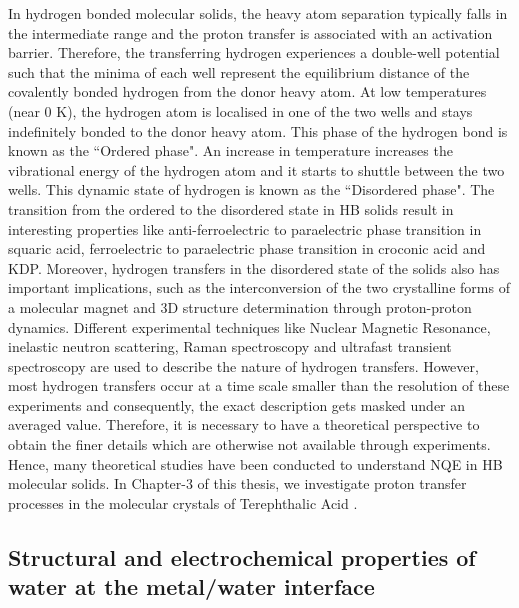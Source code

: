 \noindent In hydrogen bonded molecular solids, the heavy atom separation typically falls in the intermediate range\cite{gilli2000towards,steiner2002hydrogen} and the proton transfer is associated with an activation barrier. Therefore, the transferring hydrogen experiences a double-well potential such that the minima of each well represent the equilibrium distance of the covalently bonded hydrogen from the donor heavy atom. At low temperatures (near 0 K), the hydrogen atom is localised in one of the two wells and stays indefinitely bonded to the donor heavy atom. This phase of the hydrogen bond is known as the ``Ordered phase". An increase in temperature increases the vibrational energy of the hydrogen atom and it starts to shuttle between the two wells. This dynamic state of hydrogen is known as the ``Disordered phase". The transition from the ordered to the disordered state in HB solids result in interesting properties like anti-ferroelectric to paraelectric phase transition in squaric acid, ferroelectric to paraelectric phase transition in croconic acid \cite{horiuchi2008organic} and KDP\cite{engel2018spatially,srinivasan2011isotope}. Moreover, hydrogen transfers in the disordered state of the solids also has important implications, such as the interconversion of the two crystalline forms of a molecular magnet\cite{armentano2005intermolecular} and 3D structure determination through proton-proton dynamics\cite{lange2003analysis}. Different experimental techniques like Nuclear Magnetic Resonance, inelastic neutron scattering, Raman spectroscopy and ultrafast transient spectroscopy are used to describe the nature of hydrogen transfers. However, most hydrogen transfers occur at a time scale smaller than the resolution of these experiments and consequently, the exact description gets masked under an averaged value. Therefore, it is necessary to have a theoretical perspective to obtain the finer details which are otherwise not available through experiments. Hence, many theoretical studies\cite{wikfeldt2014communication,litman2020temperature,sttoceek2022importance,fallacara2021thermal,rossi2016anharmonic} have been conducted to understand NQE in HB  molecular solids. In Chapter-3 of this thesis, we investigate proton transfer processes in the molecular crystals of Terephthalic Acid .

\subsection{Structural and electrochemical properties of water at the metal/water interface}


